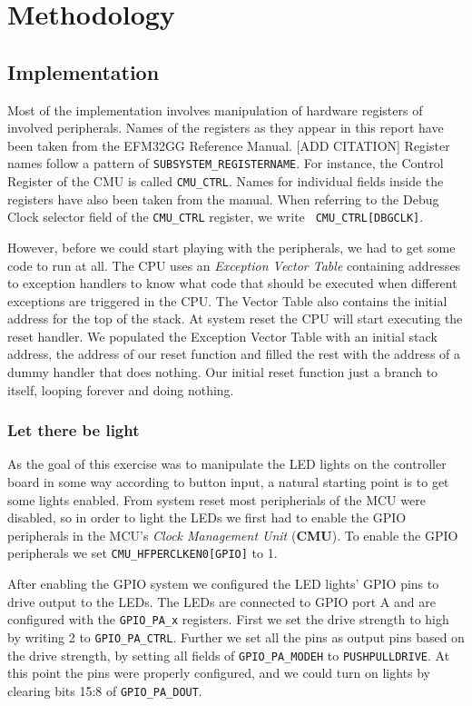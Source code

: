 \chapter{Methodology}

\section{Implementation}

Most of the implementation involves manipulation of hardware registers of
involved peripherals. Names of the registers as they appear in this report have
been taken from the EFM32GG Reference Manual. [ADD CITATION] Register names
follow a pattern of {\tt SUBSYSTEM\_REGISTERNAME}. For instance, the Control
Register of the CMU is called  {\tt CMU\_CTRL}. Names for individual fields
inside the registers have also been taken from the manual. When referring to the
Debug Clock selector field of the {\tt CMU\_CTRL} register, we write {\tt
CMU\_CTRL[DBGCLK]}.

However, before we could start playing with the peripherals, we had to get some
code to run at all. The CPU uses an \emph{Exception Vector Table} containing
addresses to exception handlers to know what code that should be executed when
different exceptions are triggered in the CPU. The Vector Table also contains
the initial address for the top of the stack. At system reset the CPU will start
executing the reset handler. We populated the Exception Vector Table with an
initial stack address, the address of our reset function and filled the rest
with the address of a dummy handler that does nothing. Our initial reset
function just a branch to itself, looping forever and doing nothing.

\subsection{Let there be light}

As the goal of this exercise was to manipulate the LED lights on the controller
board in some way according to button input, a natural starting point is to get
some lights enabled. From system reset most peripherials of the MCU were
disabled, so in order to light the LEDs we first had to enable the GPIO
peripherals in the MCU's \emph{Clock Management Unit} (\textbf{CMU}). To enable
the GPIO peripherals we set {\tt CMU\_HFPERCLKEN0[GPIO]} to 1.

After enabling the GPIO system we configured the LED lights' GPIO pins to drive
output to the LEDs. The LEDs are connected to GPIO port A and are configured
with the {\tt GPIO\_PA\_x} registers. First we set the drive strength to high by
writing 2 to {\tt GPIO\_PA\_CTRL}. Further we set all the pins as output pins
based on the drive strength, by setting all fields of {\tt GPIO\_PA\_MODEH} to
{\tt PUSHPULLDRIVE}. At this point the pins were properly configured, and we
could turn on lights by clearing bits 15:8 of {\tt GPIO\_PA\_DOUT}.

